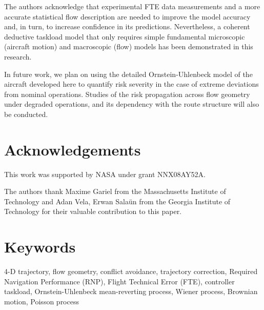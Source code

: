\documentclass[conference]{IEEEtran}
\begin{document}
The authors acknowledge that experimental FTE data measurements and a more accurate statistical flow description are needed to improve the model accuracy and, in turn, to increase confidence in its predictions. Nevertheless, a coherent deductive taskload model that only requires simple fundamental microscopic (aircraft motion) and macroscopic (flow) models has been demonstrated in this research.

In future work, we plan on using the detailed Ornstein-Uhlenbeck model of the aircraft developed here to quantify risk severity in the case of extreme deviations from nominal operations. Studies of the risk propagation across flow geometry under degraded operations, and its dependency with the route structure will also be conducted.



\section*{Acknowledgements}

This work was supported by NASA under grant NNX08AY52A.

The authors thank Maxime Gariel from the Massachusetts Institute of Technology and Adan Vela, Erwan Sala\"{u}n from the Georgia Institute of Technology for their valuable contribution to this paper.


















\section*{Keywords}
\scriptsize{4-D trajectory, flow geometry, conflict avoidance, trajectory correction, Required Navigation Performance (RNP), Flight Technical Error (FTE), controller taskload, Ornstein-Uhlenbeck mean-reverting process, Wiener process, Brownian motion, Poisson process}
\end{document}
